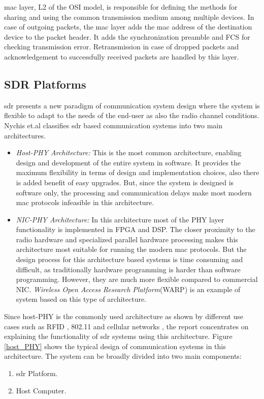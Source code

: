 \ac{mac} layer, \ac{L2} of the \ac{OSI} model, is responsible for defining the methods for sharing and using the common transmission medium among multiple devices.
In case of outgoing packets, the \ac{mac} layer adds the \ac{mac} address of the destination device to the packet header.
It adds the synchronization preamble and \ac{FCS} for checking transmission error.
Retransmission in case of dropped packets and acknowledgement to successfully received packets are handled by this layer.\\
 

\subsection{SDR Platforms}

\ac{sdr} presents a new paradigm of communication system design where the system is flexible to adapt to the needs of the end-user as also the radio channel conditions. Nychis et.al \cite{nychis_enabling_nodate} classifies \ac{sdr} based communication systems into two main architectures.
\begin{itemize} 
\item{\textit{Host-PHY Architecture:} This is the most common architecture, enabling design and development of the entire system in software.
It provides the maximum flexibility in terms of design and implementation choices, also there is added benefit of easy upgrades.
But, since the system is designed is software only, the processing and communication delays make most modern \ac{mac} protocols infeasible in this architecture.}


\item{\textit{NIC-PHY Architecture:} In this architecture most of the \ac{PHY} layer functionality is implemented in \ac{FPGA} and \ac{DSP}.
The closer proximity to the radio hardware and specialized parallel hardware processing makes this architecture most suitable for running the modern \ac{mac} protocols.
But the design process for this architecture based systems is time consuming and difficult, as traditionally hardware programming is harder than software programming.
However, they are much more flexible compared to commercial \ac{NIC}.
\textit{Wireless Open Access Research Platform}(WARP) \cite{noauthor_warp_nodate} is an example of system based on this type of architecture.}

\end{itemize}
Since host-PHY \cite{nychis_enabling_nodate} is the commonly used architecture as shown by different use cases such as RFID \cite{buettner_software_2011}, 802.11 \cite{bloessl_towards_2013} and cellular networks \cite{demel_lte_2015}, the report concentrates on explaining the functionality of \ac{sdr} systems using this architecture.
Figure \ref{host_PHY} shows the typical design of communication systems in this architecture. The system can be broadly divided into two main components:
\begin{enumerate}
\item{\ac{sdr} Platform.}
\item{Host Computer.}
\end{enumerate}


